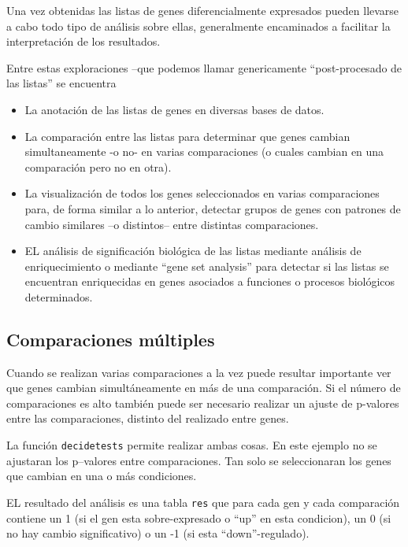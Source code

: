 \documentclass[a4paper]{article}\usepackage[]{graphicx}\usepackage[]{color}
\begin{document}
Una vez obtenidas las listas de genes diferencialmente expresados pueden llevarse a cabo todo tipo de análisis sobre ellas, generalmente encaminados a facilitar la interpretación de los resultados.

Entre estas exploraciones --que podemos llamar genericamente ``post-procesado de las listas'' se encuentra

\begin{itemize}
\item La anotación de las listas de genes en diversas bases de datos.

\item La comparaci\'on entre las listas para determinar que genes cambian simultaneamente -o no- en varias comparaciones (o cuales cambian en una comparaci\'on pero no en otra).
\item La visualización de todos los genes seleccionados en varias comparaciones para, de forma similar a lo anterior, detectar grupos de genes con patrones de cambio similares --o distintos-- entre distintas comparaciones.
\item EL análisis de significación biológica de las listas mediante análisis de enriquecimiento o mediante ``gene set analysis'' para detectar si las listas se encuentran enriquecidas en genes asociados a funciones o procesos biológicos determinados.
\end{itemize}


\subsection{Comparaciones múltiples}

Cuando se realizan varias comparaciones a la vez puede resultar importante ver 
que genes cambian simultáneamente en más de una comparaci\'on.
Si el número de comparaciones es alto también puede ser necesario realizar un 
ajuste de p-valores entre las comparaciones, distinto del realizado entre genes.

La función \texttt{decidetests} permite realizar ambas cosas.
En este ejemplo no se ajustaran los p--valores entre comparaciones. Tan solo se seleccionaran los genes que cambian en una o más condiciones.

EL resultado del análisis es una tabla \texttt{res} que para cada gen y cada comparaci\'on 
contiene un 1 (si el gen esta sobre-expresado o ``up'' en esta condicion), 
un 0 (si no hay cambio significativo) o un -1 
(si esta ``down''-regulado).
\end{document}
